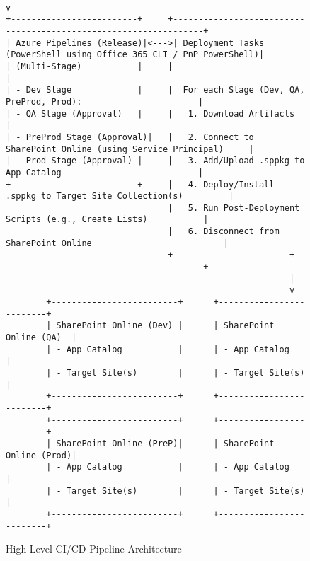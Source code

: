 \begin{figure}[htbp]
{\begin{verbatim}
                                                                 v
+-------------------------+     +-----------------------------------------------------------------+
| Azure Pipelines (Release)|<--->| Deployment Tasks (PowerShell using Office 365 CLI / PnP PowerShell)|
| (Multi-Stage)           |     |                                                                 |
| - Dev Stage             |     |  For each Stage (Dev, QA, PreProd, Prod):                       |
| - QA Stage (Approval)   |     |   1. Download Artifacts                                         |
| - PreProd Stage (Approval)|   |   2. Connect to SharePoint Online (using Service Principal)     |
| - Prod Stage (Approval) |     |   3. Add/Upload .sppkg to App Catalog                           |
+-------------------------+     |   4. Deploy/Install .sppkg to Target Site Collection(s)         |
                                |   5. Run Post-Deployment Scripts (e.g., Create Lists)           |
                                |   6. Disconnect from SharePoint Online                          |
                                +-----------------------+-----------------------------------------+
                                                        |
                                                        v
        +-------------------------+      +-------------------------+
        | SharePoint Online (Dev) |      | SharePoint Online (QA)  |
        | - App Catalog           |      | - App Catalog           |
        | - Target Site(s)        |      | - Target Site(s)        |
        +-------------------------+      +-------------------------+
        +-------------------------+      +-------------------------+
        | SharePoint Online (PreP)|      | SharePoint Online (Prod)|
        | - App Catalog           |      | - App Catalog           |
        | - Target Site(s)        |      | - Target Site(s)        |
        +-------------------------+      +-------------------------+
    \end{verbatim}%
    }
    \caption{High-Level CI/CD Pipeline Architecture}
    \label{fig:HighLevelArchitecture}
\end{figure}

